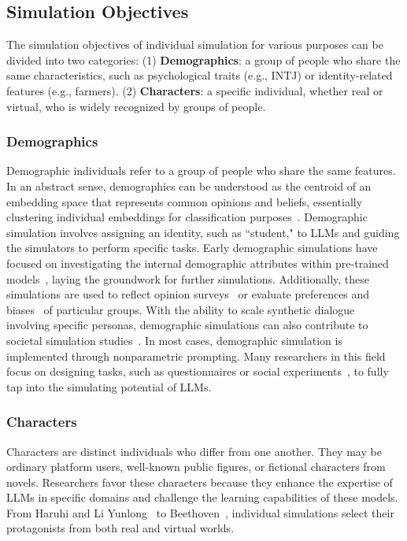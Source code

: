 \subsection{Simulation Objectives}\label{subsec:indi_obj}

The simulation objectives of individual simulation for various purposes can be divided into two categories: (1) \textbf{Demographics}: a group of people who share the same characteristics, such as psychological traits (e.g., INTJ) or identity-related features (e.g., farmers). (2) \textbf{Characters}: a specific individual, whether real or virtual, who is widely recognized by groups of people.

\subsubsection{Demographics}
Demographic individuals refer to a group of people who share the same features. In an abstract sense, demographics can be understood as the centroid of an embedding space that represents common opinions and beliefs, essentially clustering individual embeddings for classification purposes~\cite{li2024steerabilitylargelanguagemodels}. Demographic simulation involves assigning an identity, such as ``student," to LLMs and guiding the simulators to perform specific tasks. Early demographic simulations have focused on investigating the internal demographic attributes within pre-trained models~\cite{Liu_2022,li2024evaluatingpsychologicalsafetylarge}, laying the groundwork for further simulations. Additionally, these simulations are used to reflect opinion surveys~\cite{Lee_2024} or evaluate preferences and biases~\cite{Qu2024PerformanceAB,lee2024exploringsocialdesirabilityresponse} of particular groups. With the ability to scale synthetic dialogue~\cite{cho2023crowdmeetspersonacreating,shen2024roleevalbilingualroleevaluation,ge2024scalingsyntheticdatacreation} involving specific personas, demographic simulations can also contribute to societal simulation studies~\cite{chen2024socialbenchsocialityevaluationroleplaying}. In most cases, demographic simulation is implemented through nonparametric prompting. Many researchers in this field focus on designing tasks, such as questionnaires or social experiments~\cite{horton2023largelanguagemodelssimulated}, to fully tap into the simulating potential of LLMs.

\subsubsection{Characters}
Characters are distinct individuals who differ from one another. They may be ordinary platform users, well-known public figures, or fictional characters from novels. Researchers favor these characters because they enhance the expertise of LLMs in specific domains and challenge the learning capabilities of these models. From Haruhi and Li Yunlong~\cite{li2023chatharuhirevivinganimecharacter} to Beethoven~\cite{xu2024characterdestinylargelanguage}, individual simulations select their protagonists from both real and virtual worlds. 

